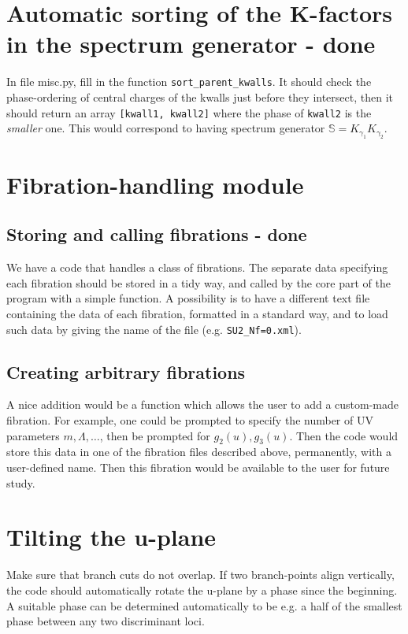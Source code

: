 \documentclass[11pt]{report}
\begin{document}
\section{Automatic sorting of the K-factors in the spectrum generator   - {\color{red} \bf done}}
In file misc.py, fill in the function {\tt sort\_{parent\_{kwalls}}}. It should check the phase-ordering of central charges of the kwalls just before they intersect, then it should return an array {\tt [kwall1, kwall2]} where the phase of {\tt kwall2} is the \emph{smaller} one. This would correspond to having spectrum generator $\mathbb{S} = K_{\gamma_{1}}K_{\gamma_{2}}$.


\section{Fibration-handling module}
\subsection{Storing and calling fibrations - {\color{red} \bf done}}
We have a code that handles a class of fibrations. The separate data specifying each fibration should be stored in a tidy way, and called by the core part of the program with a simple function.
A possibility is to have a different text file containing the data of each fibration, formatted in a standard way, and to load such data by giving the name of the file (e.g. {\tt SU2\_Nf=0.xml}).

\subsection{Creating arbitrary fibrations}
A nice addition would be a function which allows the user to add a custom-made fibration. For example, one could be prompted to specify the number of UV parameters $m,\Lambda,\dots$, then be prompted for $g_{2}(u), g_{3}(u)$. Then the code would store this data in one of the fibration files described above, permanently, with a user-defined name. Then this fibration would be available to the user for future study.



\section{Tilting the u-plane}
Make sure that branch cuts do not overlap. If two branch-points align vertically, the code should automatically rotate the u-plane by a phase since the beginning.
A suitable phase can be determined automatically to be e.g. a half of the smallest phase between any two discriminant loci.
\end{document}
